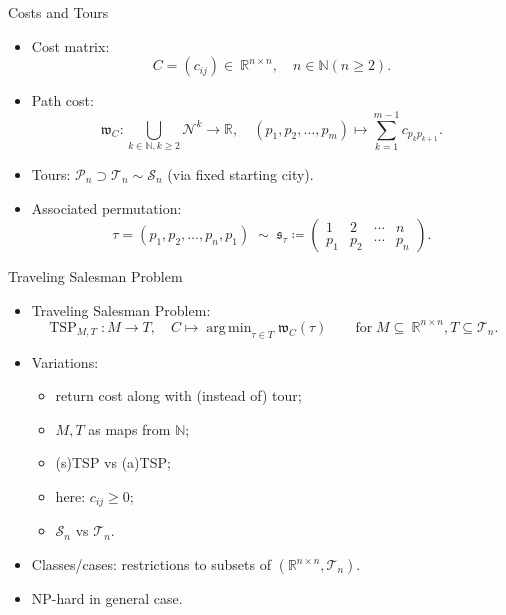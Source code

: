 \documentclass[
  size=10pt,
  style=klope,
  paper=screen,
  pauseslide,
  nopagebreaks,
  hlsections,
  fleqn
]{powerdot}
\DeclareMathOperator*{\argmin}{arg\,min}
\def\eqitspace{\vspace{-5mm}}
\begin{document}
\begin{slide}[toc=]{Costs and Tours}
\begin{itemize}
  \item
  Cost matrix:
  \begin{equation}
    C = \left(c_{ij}\right) \in~\mathbb{R}^{n \times n},
    \quad n \in \mathbb{N} \left(n \geq 2\right).
  \end{equation}
  \eqitspace
  \item
  Path cost:
  \begin{equation}
    \mathfrak{w}_C: \bigcup_{k \in \mathbb{N}, k \geq 2}\mathcal{N}^k \to \mathbb{R}, \quad
    \left(p_1,p_2,\ldots,p_m\right) \mapsto \sum_{k=1}^{m-1} c_{p_k p_{k+1}}.
  \end{equation}
  \eqitspace
  \item
  Tours: $\mathcal{P}_n \supset \mathcal{T}_n \sim \mathcal{S}_n$ (via fixed starting city).
  \item
  Associated permutation:
  \begin{equation}
  \tau = \left(p_1, p_2, \ldots, p_n, p_1 \right)
  \; \sim \;
  \mathfrak{s}_\tau \coloneqq
  \begin{pmatrix}
    1 & 2 & \cdots & n \\
    p_1 & p_2 & \cdots &  p_n
  \end{pmatrix}.
  \end{equation}
\end{itemize}
\end{slide}

\begin{slide}{Traveling Salesman Problem}
\begin{itemize}
  \item
  Traveling Salesman Problem:
  \begin{equation}
    \operatorname{TSP}_{M,T}: M \to T, \quad
    C \mapsto \argmin_{\tau \in T} \mathfrak{w}_C\left(\tau\right)
    \qquad \text{for} \; M \subseteq~\mathbb{R}^{n \times n}, T \subseteq \mathcal{T}_n.
  \end{equation}
  \eqitspace
  \item
  Variations:
  \begin{itemize}
  \item return cost along with (instead of) tour;
  \item $M, T$ as maps from $\mathbb{N}$;
  \item (s)TSP vs (a)TSP;
  \item here: $c_{ij} \geq 0$;
  \item $\mathcal{S}_n$ vs $\mathcal{T}_n$.
  \end{itemize}
  \item
  Classes/cases: restrictions to subsets of $(\mathbb{R}^{n \times n}, \mathcal{T}_n)$.
  \item
  NP-hard in general case.
\end{itemize}
\end{slide}
\end{document}
